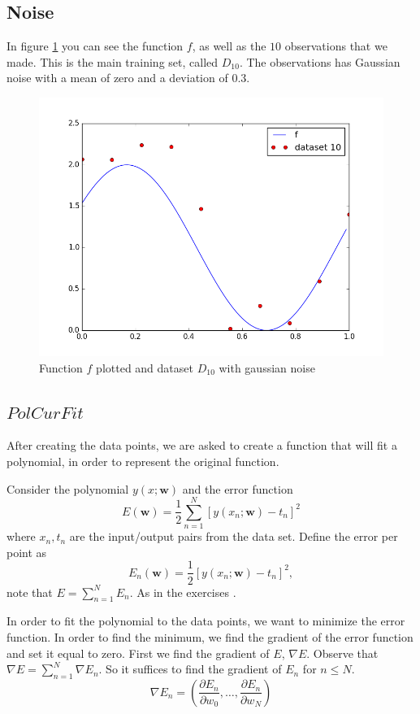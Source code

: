 \documentclass[11pt]{article}
\begin{document}
\subsection{Noise}
\label{sec:noise}
In figure \ref{fig:noise} you can see the function $f$, as well as the $10$ observations that we made. This is the main training set, called $D_{10}$. The observations has Gaussian noise with a mean of zero and a deviation of 0.3. 
\begin{figure}[H]
	\centering
		\includegraphics[trim={1cm 1cm 0.5cm 0.7cm},clip, scale=0.5]{images/exercise1_1.png}
		\caption{Function $f$ plotted and dataset $D_{10}$ with gaussian noise}
	\label{fig:noise}
\end{figure}

\subsection{$PolCurFit$}
After creating the data points, we are asked to create a function that will fit a polynomial, in order to represent the original function.

Consider the polynomial $y(x;\textbf{w})$ and the error function 
\[
E(\textbf{w})= \frac{1}{2} \sum^N_{n=1} \left[y(x_n;\textbf{w})-t_n\right]^2
\]
where $x_n,t_n$ are the input/output pairs from the data set. Define the error per point as 
\[
E_n(\textbf{w})= \frac{1}{2} \left[y(x_n;\textbf{w})-t_n\right]^2,
\] note that $E = \sum^N_{n=1}E_n$. As in the exercises \cite{test}.

In order to fit the polynomial to the data points, we want to minimize the error function. In order to find the minimum, we find the gradient of the error function and set it equal to zero. First we find the gradient of $E$, $\nabla E$. Observe that $\nabla E = \sum^N_{n=1}\nabla E_n$. So it suffices to find the gradient of $E_n$ for $n\leq N$.
\[
\nabla E_n = \left(\frac{\partial E_n}{\partial w_0},\dots,\frac{\partial E_n}{\partial w_N}\right)
\]
\end{document}
